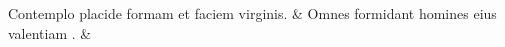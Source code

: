 \documentclass[12pt,onecolumn,twoside,a4paper]{memoir}
\begin{document}
               \begin{pairs}
                  \begin{Leftside}
			\beginnumbering
			\setcounter{stanzaL}{0}
                     
                         \stanza 
                     
                              Contemplo
                              placide
                              formam
                              et
                              faciem
                              virginis. \&
                         \stanza 
                     Omnes
                              formidant
                              homines
                              eius
                              valentiam
                              . \&
                         \stanza 
                     

\end{Leftside}
\end{pairs}
\end{document}
